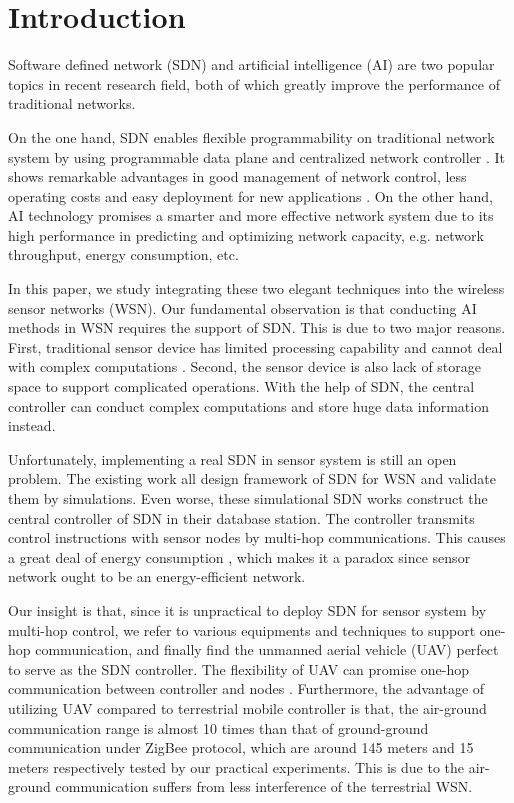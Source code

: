 \section{Introduction}




 
Software defined network (SDN) and artificial intelligence (AI) 
are two popular topics in recent research field, 
both of which greatly improve the performance of traditional
networks.
 
On the one hand, SDN enables flexible 
programmability on traditional network system 
by using programmable data plane and centralized network controller \cite{7122247}.
It shows remarkable advantages in good management of network control, 
less operating costs and easy deployment for new applications \cite{Feamster2014The}.
On the other hand, AI technology promises a smarter and more effective network system
due to its high performance in predicting and optimizing network capacity,
e.g. network throughput, energy consumption, etc.

In this paper, we study integrating these two elegant techniques into 
the wireless sensor networks (WSN). Our fundamental observation is 
that conducting AI methods in WSN requires
the support of SDN. This is due to two major reasons. 
First, traditional sensor device 
has limited processing capability and cannot deal with complex computations \cite{Sharma2012Security}.
Second, the sensor device is also lack of storage space 
to support complicated operations. With the help of SDN, 
the central controller can conduct complex computations 
and store huge data information instead.
  
Unfortunately, implementing a real SDN in sensor system 
is still an open problem. The existing work 
 \cite{mahmud2011exploitation, costanzo2012software, luo2012sensor, de2015tinysdn, galluccio2015sdn} 
all design framework of SDN for WSN and validate them by simulations.  
Even worse, these simulational SDN works construct the central controller 
of SDN in their database station. The controller transmits control 
instructions with sensor nodes by multi-hop communications.
This causes a great deal of energy consumption \cite{Yang2014}, which 
makes it a paradox since sensor network ought to be an energy-efficient network.

Our insight is that, since it is unpractical to deploy SDN 
for sensor system by multi-hop control,
we refer to various equipments and techniques to support one-hop communication, 
and finally find the unmanned aerial vehicle (UAV) 
perfect to serve as the SDN controller. The flexibility
of UAV can promise one-hop communication between controller
and nodes \cite{Sara2016a}. Furthermore, the advantage of utilizing UAV compared to
terrestrial mobile controller is that, the air-ground communication range
is almost 10 times than that of ground-ground communication under ZigBee protocol, which are
around 145 meters and 15 meters respectively tested by our practical experiments.
This is due to the air-ground communication suffers from less interference of the terrestrial WSN.
 

